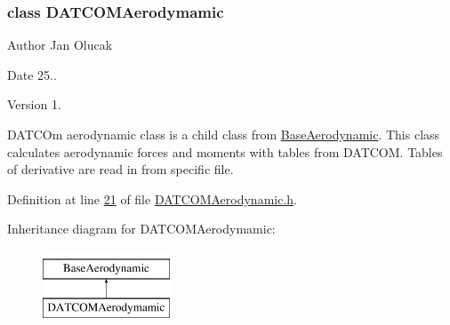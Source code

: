 \label{class_d_a_t_c_o_m_aerodymamic}
\subsubsection{class D\+A\+T\+C\+O\+M\+Aerodymamic}
\begin{DoxyAuthor}{Author}
Jan Olucak 
\end{DoxyAuthor}
\begin{DoxyDate}{Date}
25.. 
\end{DoxyDate}
\begin{DoxyVersion}{Version}
1.
\end{DoxyVersion}
D\+A\+T\+C\+Om aerodynamic class is a child class from \hyperlink{group___aerodynamic_class_base_aerodynamic}{Base\+Aerodynamic}. This class calculates aerodynamic forces and moments with tables from D\+A\+T\+C\+OM. Tables of derivative are read in from specific file. 

Definition at line \hyperlink{_d_a_t_c_o_m_aerodynamic_8h_source_l00021}{21} of file \hyperlink{_d_a_t_c_o_m_aerodynamic_8h_source}{D\+A\+T\+C\+O\+M\+Aerodynamic.\+h}.

Inheritance diagram for D\+A\+T\+C\+O\+M\+Aerodymamic\+:\begin{figure}[H]
\begin{center}
\leavevmode
\includegraphics[height=2.000000cm]{group___aerodynamic}
\end{center}
\end{figure}
